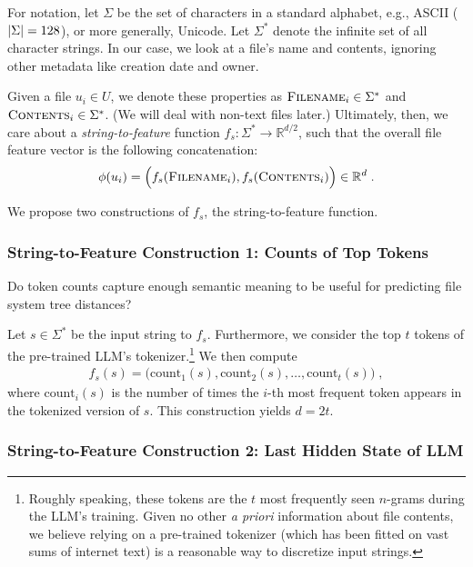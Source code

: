 \documentclass{article}
\begin{document}
For notation, let $\Sigma$ be the set of characters in a standard alphabet, e.g., ASCII ($\abs{\Sigma} = 128$), or more generally, Unicode. Let $\Sigma^*$ denote the infinite set of all character strings. In our case, we look at a file's name and contents, ignoring other metadata like creation date and owner.

Given a file $u_i \in U$, we denote these properties as $\textsc{Filename}_i \in \Sigma^*$ and $\textsc{Contents}_i \in \Sigma^*$. (We will deal with non-text files later.) Ultimately, then, we care about a \emph{string-to-feature} function $f_s: \Sigma^* \to \mathbb R^{d/2}$, such that the overall file feature vector is the following concatenation:
\begin{align}
  \phi(u_i) =
  \Big( f_s(\textsc{Filename}_i), f_s(\textsc{Contents}_i) \Big) \in \mathbb R^d \; .
\end{align}

We propose two constructions of $f_s$, the string-to-feature function.

\subsubsection{String-to-Feature Construction 1: Counts of Top Tokens}

Do token counts capture enough semantic meaning to be useful for predicting file system tree distances?

Let $s \in \Sigma^*$ be the input string to $f_s$. Furthermore, we consider the top $t$ tokens of the pre-trained LLM's tokenizer.\footnote{Roughly speaking, these tokens are the $t$ most frequently seen $n$-grams during the LLM's training. Given no other \emph{a priori} information about file contents, we believe relying on a pre-trained tokenizer (which has been fitted on vast sums of internet text) is a reasonable way to discretize input strings.} We then compute
\begin{align}
  f_s(s) = \Big( \text{count}_1(s), \text{count}_2(s), \dots, \text{count}_t(s) \Big) \; ,
\end{align}
where $\text{count}_i(s)$ is the number of times the $i$-th most frequent token appears in the tokenized version of $s$. This construction yields $d = 2t$.

\subsubsection{String-to-Feature Construction 2: Last Hidden State of LLM}
\end{document}

